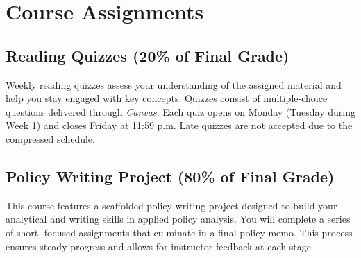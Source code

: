 \documentclass[11pt, letterpaper]{article}
\begin{document}
\section{Course Assignments}

\subsection*{Reading Quizzes (20\% of Final Grade)}
Weekly reading quizzes assess your understanding of the assigned material and help you stay engaged with key concepts. Quizzes consist of multiple-choice questions delivered through \emph{Canvas}. Each quiz opens on Monday (Tuesday during Week 1) and closes Friday at 11:59 p.m. Late quizzes are not accepted due to the compressed schedule.

\subsection*{Policy Writing Project (80\% of Final Grade)}
This course features a scaffolded policy writing project designed to build your analytical and writing skills in applied policy analysis. You will complete a series of short, focused assignments that culminate in a final policy memo. This process ensures steady progress and allows for instructor feedback at each stage.
\end{document}
